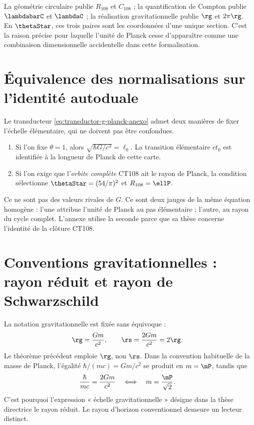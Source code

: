\begin{remark}
La géométrie circulaire publie \(R_{108}\) et \(C_{108}\) ; la quantification de
Compton publie \(\lambdabarC\) et \(\lambdaC\) ; la réalisation gravitationnelle
publie \(\rg\) et \(2\pi\rg\). En \(\thetaStar\), ces trois paires sont les
coordonnées d’une unique section. C’est la raison précise pour laquelle
l’unité de Planck cesse d’apparaître comme une combinaison dimensionnelle accidentelle
dans cette formalisation.
\end{remark}

\section{Équivalence des normalisations sur l’identité autoduale}

Le transducteur \eqref{eq:transductor-g-planck-anexo} admet deux manières de
fixer l’échelle élémentaire, qui ne doivent pas être confondues.

\begin{enumerate}[label=\textup{(\roman*)}]
\item Si l’on fixe \(\theta=1\), alors
\(\sqrt{\hbar G/c^3}=\ell_0\). La transition élémentaire \(ct_0\) est identifiée
à la longueur de Planck de cette carte.
\item Si l’on exige que l’\emph{orbite complète} CT108 ait le rayon de Planck,
la condition sélectionne \(\thetaStar=(54/\pi)^2\) et
\(R_{108}=\ellP\).
\end{enumerate}

Ce ne sont pas des valeurs rivales de \(G\). Ce sont deux jauges de la même équation
homogène : l’une attribue l’unité de Planck au pas élémentaire ; l’autre, au rayon
du cycle complet. L’annexe utilise la seconde parce que sa thèse concerne
l’identité de la clôture CT108.

\section{Conventions gravitationnelles : rayon réduit et rayon de Schwarzschild}

La notation gravitationnelle est fixée sans équivoque :
\[
\rg=\frac{Gm}{c^2},
\qquad
\rs=\frac{2Gm}{c^2}=2\rg.
\]
Le théorème précédent emploie \(\rg\), non \(\rs\). Dans la convention habituelle de
la masse de Planck, l’égalité \(\hbar/(mc)=Gm/c^2\) se produit en \(m=\mP\),
tandis que
\begin{equation}
\frac{\hbar}{mc}=\frac{2Gm}{c^2}
\quad\Longleftrightarrow\quad
m=\frac{\mP}{\sqrt2}.
\label{eq:cruce-schwarzschild-factor-dos}
\end{equation}
C’est pourquoi l’expression « échelle gravitationnelle » désigne dans la thèse directrice le rayon
réduit. Le rayon d’horizon conventionnel demeure un lecteur distinct.

